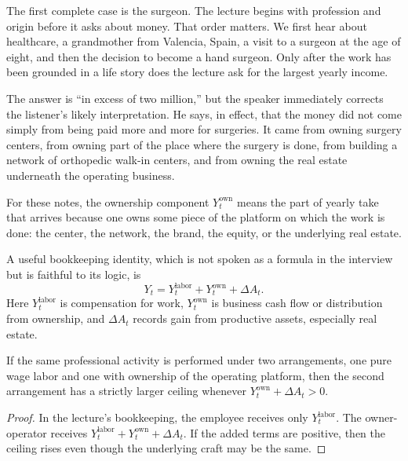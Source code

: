 The first complete case is the surgeon. The lecture begins with profession and origin before it asks about money. That order matters. We first hear about healthcare, a grandmother from Valencia, Spain, a visit to a surgeon at the age of eight, and then the decision to become a hand surgeon. Only after the work has been grounded in a life story does the lecture ask for the largest yearly income.

The answer is ``in excess of two million,'' but the speaker immediately corrects the listener's likely interpretation. He says, in effect, that the money did not come simply from being paid more and more for surgeries. It came from owning surgery centers, from owning part of the place where the surgery is done, from building a network of orthopedic walk-in centers, and from owning the real estate underneath the operating business.

\begin{definition}
For these notes, the ownership component \(Y_t^{\text{own}}\) means the part of yearly take that arrives because one owns some piece of the platform on which the work is done: the center, the network, the brand, the equity, or the underlying real estate.
\end{definition}

A useful bookkeeping identity, which is not spoken as a formula in the interview but is faithful to its logic, is
\begin{equation}
Y_t = Y_t^{\text{labor}} + Y_t^{\text{own}} + \Delta A_t.
\end{equation}
Here \(Y_t^{\text{labor}}\) is compensation for work, \(Y_t^{\text{own}}\) is business cash flow or distribution from ownership, and \(\Delta A_t\) records gain from productive assets, especially real estate.

\begin{proposition}
If the same professional activity is performed under two arrangements, one pure wage labor and one with ownership of the operating platform, then the second arrangement has a strictly larger ceiling whenever \(Y_t^{\text{own}}+\Delta A_t>0\).
\end{proposition}

\begin{proof}
In the lecture's bookkeeping, the employee receives only \(Y_t^{\text{labor}}\). The owner-operator receives \(Y_t^{\text{labor}} + Y_t^{\text{own}} + \Delta A_t\). If the added terms are positive, then the ceiling rises even though the underlying craft may be the same.
\end{proof}

